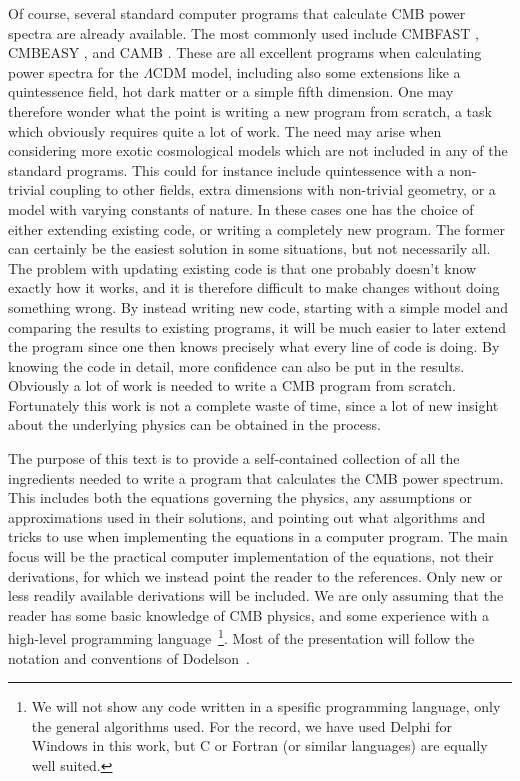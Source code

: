\documentclass[twocolumn,nofootinbib,amsmath,amssymb]{revtex4}
\newcommand{\lcdm}{\Lambda\mathrm{CDM}}
\begin{document}
Of course, several standard computer programs that calculate CMB power spectra
are already available. The most commonly used include CMBFAST \cite{CMBFAST,
CMBFAST_web}, CMBEASY\- \cite{CMBEASY}, and CAMB \cite{CAMB}. These are all
excellent programs when calculating power spectra for the $\lcdm$ model,
including also some extensions like a quintessence field, hot dark matter or a
simple fifth dimension. One may therefore wonder what the point is writing a
new program from scratch, a task which obviously requires quite a lot of work.
The need may arise when considering more exotic cosmological models which are
not included in any of the standard programs. This could for instance include
quintessence with a non-trivial coupling to other fields, extra dimensions with
non-trivial geometry, or a model with varying constants of nature. In these
cases one has the choice of either extending existing code, or writing a
completely new program. The former can certainly be the easiest solution in
some situations, but not necessarily all. The problem with updating existing
code is that one probably doesn't know exactly how it works, and it is
therefore difficult to make changes without doing something wrong. By instead
writing new code, starting with a simple model and comparing the results to
existing programs, it will be much easier to later extend the program since one
then knows precisely what every line of code is doing. By knowing the code in
detail, more confidence can also be put in the results. Obviously a lot of work
is needed to write a CMB program from scratch. Fortunately this work is not a
complete waste of time, since a lot of new insight about the underlying physics
can be obtained in the process.

The purpose of this text is to provide a self-contained collection of all the
ingredients needed to write a program that calculates the CMB power spectrum.
This includes both the equations governing the physics, any assumptions or
approximations used in their solutions, and pointing out what algorithms and
tricks to use when implementing the equations in a computer program. The main
focus will be the practical computer implementation of the equations, not their
derivations, for which we instead point the reader to the references. Only new
or less readily available derivations will be included. We are only assuming
that the reader has some basic knowledge of CMB physics, and some experience
with a high-level programming language~\footnote{We will not show any code
written in a spesific programming language, only the general algorithms used.
For the record, we have used Delphi for Windows \cite{Delphi} in this work, but
C or Fortran (or similar languages) are equally well suited.}. Most of the
presentation will follow the notation and conventions of
Dodelson~\cite{Dodelson}.
\end{document}
